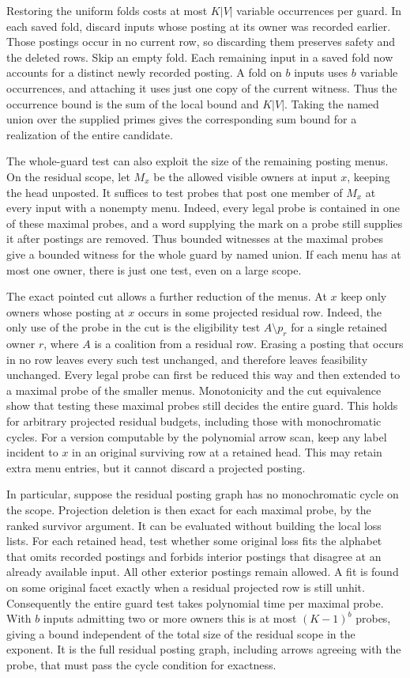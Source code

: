 Restoring the uniform folds costs at most
$K|V|$ variable occurrences per guard. In
each saved fold, discard inputs whose posting
at its owner was recorded earlier. Those
postings occur in no current row, so
discarding them preserves safety and the
deleted rows. Skip an empty fold. Each
remaining input in a saved fold now
accounts for a distinct newly recorded
posting. A fold on $b$ inputs uses $b$
variable occurrences, and attaching it
uses just one copy of the current witness.
Thus the occurrence bound is the sum of the
local bound and $K|V|$. Taking the named
union over the supplied primes gives the
corresponding sum bound for a realization
of the entire candidate.

The whole-guard test can also exploit the size
of the remaining posting menus. On the residual
scope, let $M_x$ be the allowed visible owners
at input $x$, keeping the head unposted.
It suffices to test probes that post one member
of $M_x$ at every input with a nonempty menu.
Indeed, every legal probe is contained in one
of these maximal probes, and a word supplying
the mark on a probe still supplies it after
postings are removed. Thus bounded witnesses
at the maximal probes give a bounded witness
for the whole guard by named union. If each
menu has at most one owner, there is just
one test, even on a large scope.

The exact pointed cut allows a further reduction
of the menus. At $x$ keep only owners whose
posting at $x$ occurs in some projected residual
row. Indeed, the only use of the probe in the
cut is the eligibility test $A\setminus p_r$
for a single retained owner $r$, where $A$ is a
coalition from a residual row. Erasing a posting
that occurs in no row leaves every such test
unchanged, and therefore leaves feasibility
unchanged. Every legal probe can first be
reduced this way and then extended to a maximal
probe of the smaller menus. Monotonicity and
the cut equivalence show that testing these
maximal probes still decides the entire guard.
This holds for arbitrary projected residual
budgets, including those with monochromatic
cycles. For a version computable by the
polynomial arrow scan, keep any label incident
to $x$ in an original surviving row at a
retained head. This may retain extra menu
entries, but it cannot discard a projected
posting.

In particular, suppose the residual posting
graph has no monochromatic cycle on the scope.
Projection deletion is then exact for each
maximal probe, by the ranked survivor argument.
It can be evaluated without building the local
loss lists. For each retained head, test whether
some original loss fits the alphabet that omits
recorded postings and forbids interior postings
that disagree at an already available input.
All other exterior postings remain allowed.
A fit is found on some original facet exactly
when a residual projected row is still unhit.
Consequently the entire guard test takes
polynomial time per maximal probe. With $b$
inputs admitting two or more owners this is at
most $(K-1)^b$ probes, giving a bound independent
of the total size of the residual scope in the
exponent. It is the full residual posting
graph, including arrows agreeing with the
probe, that must pass the cycle condition for
exactness.

